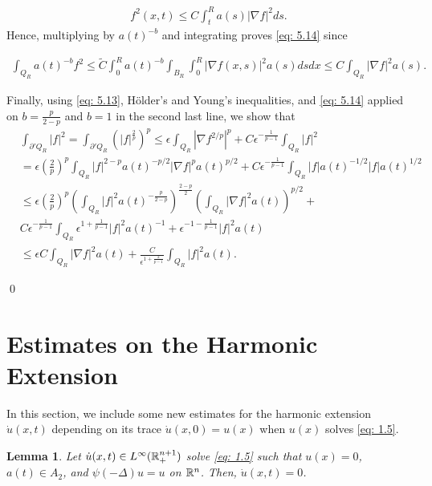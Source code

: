 \documentclass{article}
\newtheorem{lemma}[theorem]{Lemma}
\begin{document}
\begin{align*}
    f^2(x,t) \le C\int_{t}^{R}a(s)|\nabla f|^2 ds.
    \tag{5.18}\label{eq: 5.18}
\end{align*}
Hence, multiplying by $a(t)^{-b}$ and integrating proves \eqref{eq: 5.14} since

\begin{align*}
    \int_{Q_R}a(t)^{-b}f^2 \le \tilde{C}\int_0^R a(t)^{-b}\int_{B_R}\int_0^R |\nabla f(x,s)|^2 a(s) dsdx \le C \int_{Q_R} |\nabla f|^2 a(s).
\end{align*}

Finally, using \eqref{eq: 5.13}, H\"{o}lder's and Young's inequalities, and \eqref{eq: 5.14} applied on $b=\frac{p}{2-p}$ and $b=1$ in the second last line, we show that
\begin{align*}
    & \int_{\partial' Q_R}|f|^2 = \int_{\partial' Q_R} (|f|^{\frac{2}{p}})^p
    \le \epsilon \int_{Q_R} |\nabla f^{2/p}|^p + C\epsilon^{-\frac{1}{p-1}}\int_{Q_R}|f|^2\\
    &= \epsilon (\frac{2}{p})^p \int_{Q_R} |f|^{2-p} a(t)^{-p/2}|\nabla f|^p a(t)^{p/2} + C\epsilon^{-\frac{1}{p-1}}\int_{Q_R}|f|a(t)^{-1/2}|f|a(t)^{1/2}\\
    & \le \epsilon (\frac{2}{p})^p \left(\int_{Q_R} |f|^2 a(t)^{-\frac{p}{2-p}}\right)^\frac{2-p}{2}\left(\int_{Q_R} |\nabla f|^2 a(t) \right)^{p/2} + \\
    & C\epsilon^{-\frac{1}{p-1}}\int_{Q_R} \epsilon^{1+\frac{1}{p-1}}|f|^2 a(t)^{-1} + \epsilon^{-1-\frac{1}{p-1}}|f|^2a(t)\\
    &\le \epsilon C \int_{Q_R} |\nabla f|^2 a(t) + \frac{C}{\epsilon^{1+\frac{2}{p-1}}}\int_{Q_R} |f|^2 a(t).
\end{align*}

\qed

\section{Estimates on the Harmonic Extension}

In this section, we include some new estimates for the harmonic extension $\dot{u}(x,t)$ depending on its trace $\dot{u}(x,0)=u(x)$ when $u(x)$ solves \eqref{eq: 1.5}. 

\begin{lemma}
\label{lm 6.1}
Let $\dot{u}(x,t)\in L^\infty(\mathbb{R}^{n+1}_+)$ solve \eqref{eq: 1.5} such that $u(x)=0$, $a(t) \in A_2$, and $\psi(-\Delta) u = u$ on $\mathbb{R}^n$. Then, $\dot{u}(x,t)=0$.
\end{lemma}
\end{document}
